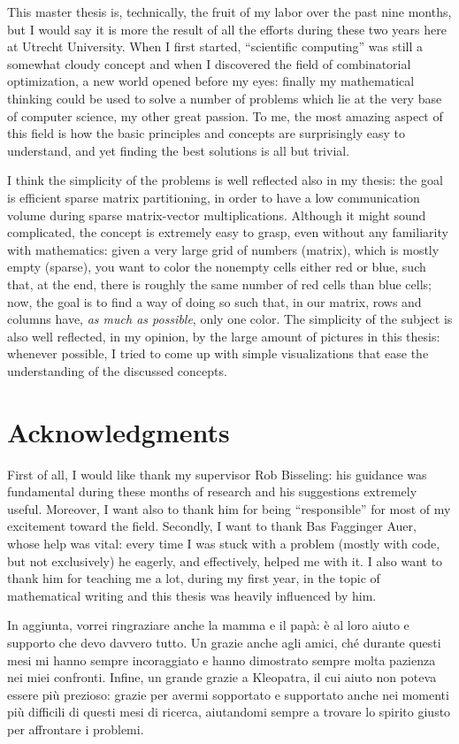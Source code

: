 This master thesis is, technically, the fruit of my labor over the past nine months, but I would say it is more the result of all the efforts during these two years here at Utrecht University. When I first started, ``scientific computing'' was still a somewhat cloudy concept and when I discovered the field of combinatorial optimization, a new world opened before my eyes: finally my mathematical thinking could be used to solve a number of problems which lie at the very base of computer science, my other great passion. To me, the most amazing aspect of this field is how the basic principles and concepts are surprisingly easy to understand, and yet finding the best solutions is all but trivial. 

I think the simplicity of the problems is well reflected also in my thesis: the goal is efficient sparse matrix partitioning, in order to have a low communication volume during sparse matrix-vector multiplications. Although it might sound complicated, the concept is extremely easy to grasp, even without any familiarity with mathematics: given a very large grid of numbers (matrix), which is mostly empty (sparse), you want to color the nonempty cells either red or blue, such that, at the end, there is roughly the same number of red cells than blue cells; now, the goal is to find a way of doing so such that, in our matrix, rows and columns have, \emph{as much as possible}, only one color. The simplicity of the subject is also well reflected, in my opinion, by the large amount of pictures in this thesis: whenever possible, I tried to come up with simple visualizations that ease the understanding of the discussed concepts.

\section*{Acknowledgments}

First of all, I would like thank my supervisor Rob Bisseling: his guidance was fundamental during these months of research and his suggestions extremely useful. Moreover, I want also to thank him for being ``responsible'' for most of my excitement toward the field. Secondly, I want to thank Bas Fagginger Auer, whose help was vital: every time I was stuck with a problem (mostly with code, but not exclusively) he eagerly, and effectively, helped me with it. I also want to thank him for teaching me a lot, during my first year, in the topic of mathematical writing and this thesis was heavily influenced by him.

In aggiunta, vorrei ringraziare anche la mamma e il papà: è al loro aiuto e supporto che devo davvero tutto. Un grazie anche agli amici, ch\'{e} durante questi mesi mi hanno sempre incoraggiato e hanno dimostrato sempre molta pazienza nei miei confronti. Infine, un grande grazie a Kleopatra, il cui aiuto non poteva essere più prezioso: grazie per avermi sopportato e supportato anche nei momenti più difficili di questi mesi di ricerca, aiutandomi sempre a trovare lo spirito giusto per affrontare i problemi.

